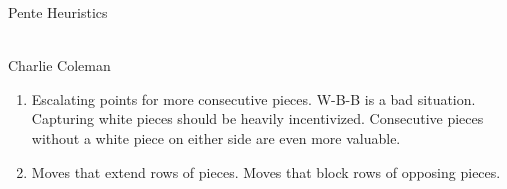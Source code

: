 \documentclass{article}
\begin{document}
	\begin{center}\begin{large}Pente Heuristics\end{large}\\Charlie Coleman\end{center}
	\begin{enumerate}
		\item Escalating points for more consecutive pieces. W-B-B is a bad situation. Capturing white pieces should be heavily incentivized. Consecutive pieces without a white piece on either side are even more valuable.
		\item Moves that extend rows of pieces. Moves that block rows of opposing pieces. 
	\end{enumerate}
\end{document}
